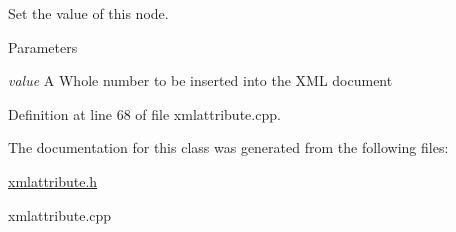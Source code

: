 Set the value of this node. 


\begin{DoxyParams}{Parameters}
\item[{\em value}]A Whole number to be inserted into the XML document \end{DoxyParams}


Definition at line 68 of file xmlattribute.cpp.



The documentation for this class was generated from the following files:\begin{DoxyCompactItemize}
\item 
\hyperlink{xmlattribute_8h}{xmlattribute.h}\item 
xmlattribute.cpp\end{DoxyCompactItemize}
